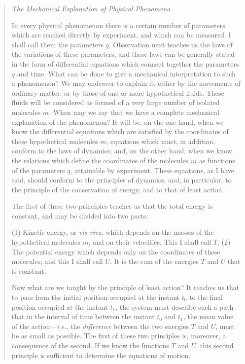 \documentclass{article}
\begin{document}
\begin{quote}
    \emph{The Mechanical Explanation of Physical Phenomena}
    
    In every physical phenomenon there is a certain number of parameters which are reached directly by experiment, and which can be measured.  I shall call them the parameters $q$.  Observation next teaches us the laws of the variations of these parameters, and these laws can be generally stated in the form of differential equations which connect together the parameters $q$ and time.  What can be done to give a mechanical interpretation to such a phenomenon?  We may endeavor to explain it, either by the movements of ordinary matter, or by those of one or more hypothetical fluids.  These fluids will be considered as formed of a very large number of isolated molecules $m$.  When may we say that we have a complete mechanical explanation of the phenomenon?  It will be, on the one hand, when we know the differential equations which are satisfied by the coordinates of these hypothetical molecules $m$, equations which must, in addition, conform to the laws of dynamics; and, on the other hand, when we know the relations which define the coordinates of the molecules $m$ as functions of the parameters $q$, attainable by experiment.  These equations, as I have said, should conform to the principles of dynamics, and, in particular, to the principle of the conservation of energy, and to that of least action.  
    
    The first of these two principles teaches us that the total energy is constant, and may be divided into two parts:
    
    (1) Kinetic energy, or \emph{vis viva}, which depends on the masses of the hypothetical molecules $m$, and on their velocities.  This I shall call $T$.  (2) The potential energy which depends only on the coordinates of these molecules, and this I shall call $U$.  It is the sum of the energies $T$ and $U$ that is constant.
    
    Now what are we taught by the principle of least action?  It teaches us that to pass from the initial position occupied at the instant $t_0$ to the final position occupied at the instant $t_1$, the system must describe such a path that in the interval of time between the instant $t_0$ and $t_1$, the mean value of the action---\emph{i.e.}, the \emph{difference} between the two energies $T$ and $U$, must be as small as possible.  The first of these two principles is, moreover, a consequence of the second.  If we know the functions $T$ and $U$, this second principle is sufficient to determine the equations of motion.  
    

\end{quote}
\end{document}
